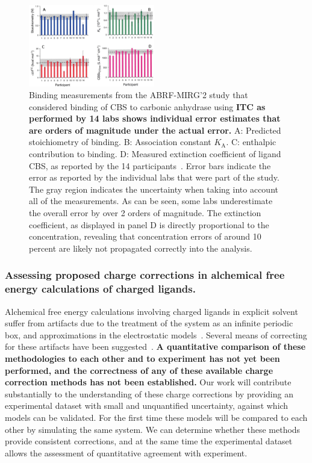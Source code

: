 \documentclass[10pt,final]{article}
\begin{document}
\begin{figure}[H]
	\centering
	\includegraphics[width=0.49\textwidth]{figures/cbs_ca_II.PNG}
	\caption{Binding measurements from the ABRF-MIRG'2 study that considered binding of CBS to carbonic anhydrase using \textbf{ITC as performed by 14 labs shows individual error estimates that are orders of magnitude under the actual error.} A: Predicted stoichiometry of binding. B: Association constant $K_\mathrm{A}$. C: enthalpic contribution to binding. D: Measured extinction coefficient of ligand CBS, as reported by the 14 participants~\autocite{Myszka2003a}. Error bars indicate the error as reported by the individual labs that were part of the study. The gray region indicates the uncertainty when taking into account all of the measurements. As can be seen, some labs underestimate the overall error by over 2 orders of magnitude. The extinction coefficient, as displayed in panel D is directly proportional to the concentration, revealing that concentration errors of around 10 percent are likely not propagated correctly into the analysis.}
	\label{figure:abrf-mirg2}	
\end{figure}

\subsubsection*{Assessing proposed charge corrections in alchemical free energy calculations of charged ligands.}
Alchemical free energy calculations involving charged ligands in explicit solvent suffer from artifacts due to the treatment of the system as an infinite periodic box, and approximations in the electrostatic models~\autocite{Rocklin2013b,Muddana2014a}. 
%
Several means of correcting for these artifacts have been suggested~\autocite{Reif2013a,Rocklin2013a,Lin2014a}.
%
\textbf{A quantitative comparison of these methodologies to each other and to experiment has not yet been performed, and the correctness of any of these available charge correction methods has not been established.}
%
Our work will contribute substantially to the understanding of these charge corrections by providing an experimental dataset with small and unquantified uncertainty, against which models can be validated.
%
For the first time these models will be compared to each other by simulating the same system.
%
We can determine whether these methods provide consistent corrections, and at the same time the experimental dataset allows the assessment of quantitative agreement with experiment.
\end{document}
